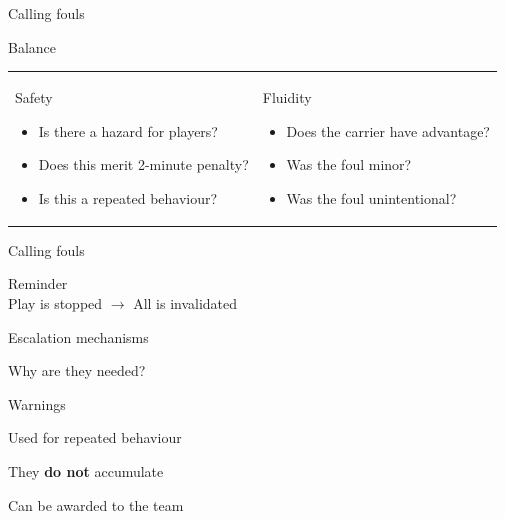 \documentclass{beamer}
\begin{document}
    \begin{frame}{Calling fouls}
        \begin{center}
            Balance
        \end{center}
        \begin{tabular}{ll}
            \parbox{0.5\textwidth}
            {
                \begin{center}
                    Safety
                \end{center}
                \begin{itemize}
                    \item Is there a hazard for players?
                    \item Does this merit 2-minute penalty?
                    \item Is this a repeated behaviour?
                \end{itemize}
            }
            &
            \parbox{0.5\textwidth}
            {
                \begin{center}
                    Fluidity
                \end{center}
                \begin{itemize}
                    \item Does the carrier have advantage?
                    \item Was the foul minor?
                    \item Was the foul unintentional?
                \end{itemize}
            }
        \end{tabular}
    \end{frame}

    \begin{frame}{Calling fouls}
        \begin{center}
            Reminder \\
            Play is stopped $\rightarrow$ All is invalidated
        \end{center}
    \end{frame}

    \begin{frame}{Escalation mechanisms}
        \begin{center}
            Why are they needed?
        \end{center}
    \end{frame}

    \begin{frame}{Warnings}
        \begin{center}
            Used for repeated behaviour

            They \textbf{do not} accumulate

            Can be awarded to the team
        \end{center}
    \end{frame}
\end{document}
